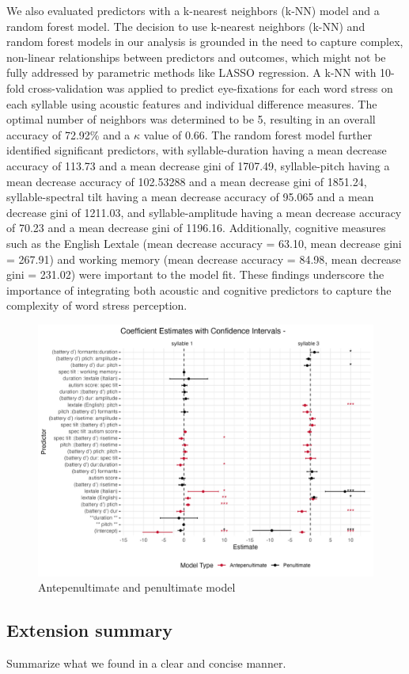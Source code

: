 We also evaluated predictors with a k-nearest neighbors (k-NN) model and a random forest model. The decision to use k-nearest neighbors (k-NN) and random forest models in our analysis is grounded in the need to capture complex, non-linear relationships between predictors and outcomes, which might not be fully addressed by parametric methods like LASSO regression. A k-NN with 10-fold cross-validation was applied to predict eye-fixations for each word stress on each syllable using acoustic features and individual difference measures. The optimal number of neighbors was determined to be 5, resulting in an overall accuracy of 72.92\% and a $\kappa$ value of 0.66. The random forest model further identified significant predictors, with syllable-duration having a mean decrease accuracy of 113.73 and a mean decrease gini of 1707.49, syllable-pitch having a mean decrease accuracy of 102.53288 and a mean decrease gini of 1851.24, syllable-spectral tilt having a mean decrease accuracy of 95.065 and a mean decrease gini of 1211.03, and syllable-amplitude having a mean decrease accuracy of 70.23 and a mean decrease gini of 1196.16. Additionally, cognitive measures such as the English Lextale (mean decrease accuracy = 63.10, mean decrease gini = 267.91) and working memory (mean decrease accuracy = 84.98, mean decrease gini = 231.02) were important to the model fit. These findings underscore the importance of integrating both acoustic and cognitive predictors to capture the complexity of word stress perception.

\begin{figure}[H]
  \centering
  \includegraphics[width=1\linewidth]{visuals/extended_analysis.jpeg} %
  \caption{Antepenultimate and penultimate model}
  \label{fig:extened_analysis}
\end{figure}


\subsection{Extension summary}
Summarize what we found in a clear and concise manner.
